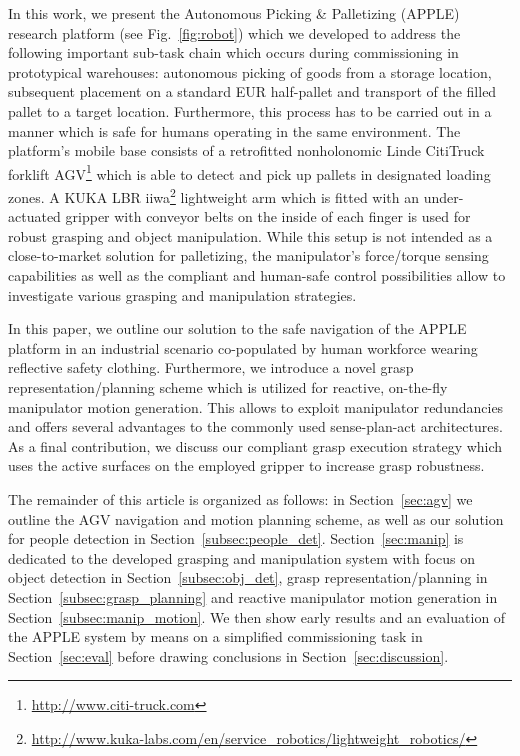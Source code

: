 In this work, we present the Autonomous Picking \& Palletizing (APPLE) research platform (see
Fig.~\ref{fig:robot}) which we developed to address the following important sub-task chain which
occurs during commissioning in prototypical warehouses: autonomous picking of goods from a storage
location, subsequent placement on a standard EUR half-pallet and transport of the filled pallet to a
target location. Furthermore, this process has to be carried out in a manner which is safe for
humans operating in the same environment. The platform's mobile base consists of a retrofitted
nonholonomic Linde CitiTruck forklift AGV\footnote{\url{ http://www.citi-truck.com}} which is able
to detect and pick up pallets in designated loading zones. A KUKA LBR
iiwa\footnote{\url{http://www.kuka-labs.com/en/service_robotics/lightweight_robotics/}} lightweight
arm which is fitted with an under-actuated gripper with conveyor belts on the inside of each finger
is used for robust grasping and object manipulation. While this setup is not intended as a
close-to-market solution for palletizing, the manipulator's force/torque sensing capabilities as
well as the compliant and human-safe control possibilities allow to investigate various grasping and
manipulation strategies.

In this paper, we outline our solution to the safe navigation of the APPLE platform in an industrial
scenario co-populated by human workforce wearing reflective safety clothing. Furthermore, we introduce a novel
grasp representation/planning scheme which is utilized for reactive, on-the-fly manipulator motion
generation. This allows to exploit manipulator redundancies and offers several advantages to the
commonly used sense-plan-act architectures. As a final contribution, we discuss our compliant grasp
execution strategy which uses the active surfaces on the employed gripper to increase grasp
robustness.

The remainder of this article is organized as follows: in Section~\ref{sec:agv} we outline the AGV
navigation and motion planning scheme, as well as our solution for people detection in
Section~\ref{subsec:people_det}. Section~\ref{sec:manip} is dedicated to the developed grasping and
manipulation system with focus on object detection in Section~\ref{subsec:obj_det}, grasp
representation/planning in Section~\ref{subsec:grasp_planning} and reactive manipulator motion
generation in Section~\ref{subsec:manip_motion}. We then show early results and an evaluation of the
APPLE system by means on a simplified commissioning task in Section~\ref{sec:eval} before drawing
conclusions in Section~\ref{sec:discussion}.
